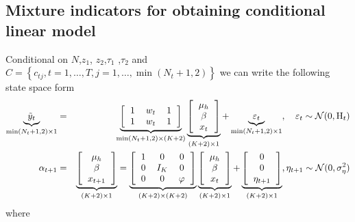\documentclass[12pt]{article}
\begin{document}
\subsection{Mixture indicators for obtaining conditional linear model}

Conditional on $N$,$z_{1}$, $z_{2}$,$\tau_{1}$ ,$\tau_{2}$  and
$C=\left\{c_{tj}, t=1, \ldots, T , j=1,\ldots, \min(N_t+1,2) \right\}$ we can write 
the following  state space form
\begin{eqnarray}
\underbrace{\tilde{y}_t }_{\min(N_t+1,2)\times 1}&=&  \underbrace{\left[ 
\begin{tabular}{ccc}
1 &$w_t$ &1 \\
 1 &$w_t$ &1
\end{tabular}
\right]}_{\min(N_t+1,2) \times (K+2)}  \underbrace{\left[ 
\begin{tabular}{c}
$\mu_{h}$ \\
$\beta $ \\
$x_{t}$
\end{tabular}
\right]}_{(K+2)\times 1}  + \underbrace{\varepsilon_{t}}_{\min(N_t+1,2)\times 1} , \quad \varepsilon_{t} \sim \mathcal{N}(0, \text{H}_t) \\ 
\alpha_{t+1}  &=& \underbrace{\left[ 
\begin{tabular}{c}
$\mu_{h}$ \\
$\beta $ \\
$x_{t+1}$
\end{tabular}
\right]}_{(K+2)\times 1} = \underbrace{\left[ 
\begin{tabular}{ccc}
1 &0& 0 \\
0& $I_{K}$ & 0 \\
0 &0& $\varphi$
\end{tabular}
\right]}_{(K+2)\times(K+2)} 
\underbrace{\left[ 
\begin{tabular}{c}
$\mu_{h}$ \\
$\beta $ \\
$x_{t}$
\end{tabular}
\right]}_{(K+2)\times 1} +\underbrace{\left[ 
\begin{tabular}{c}
0 \\
0 \\
$\eta_{t+1}$
\end{tabular}
\right]}_{(K+2)\times 1}  ,  \eta_{t+1} \sim \mathcal{N}(0,\sigma _{\eta}^{2}) \\ 
\end{eqnarray}
where 
\end{document}
